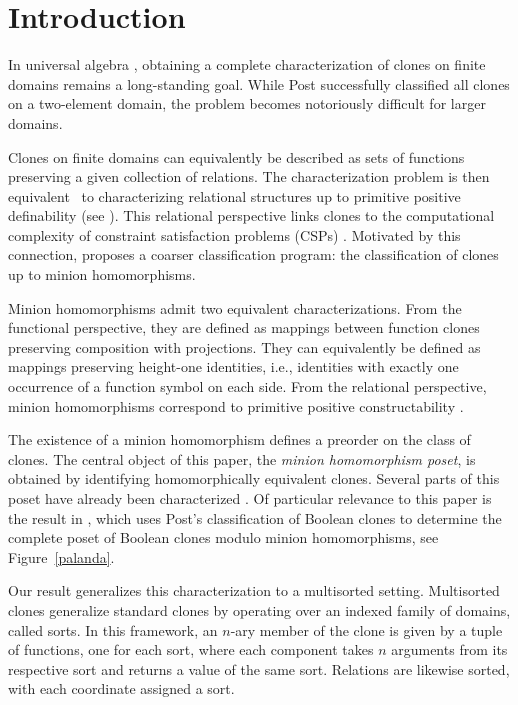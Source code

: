 \documentclass{amsart}
\numberwithin{equation}{section}
\theoremstyle{plain}
\theoremstyle{definition}
\begin{document}
\section{Introduction}\label{sec:intro}

    In universal algebra \cite{universal1, universal2, universal3}, obtaining a complete characterization of clones on finite domains remains a long-standing goal. While Post \cite{post} successfully classified all clones on a two-element domain, the problem becomes notoriously difficult for larger domains. 

  Clones on finite domains can equivalently be described as sets of functions preserving a given collection of relations. The characterization problem is then equivalent~\cite{bodnarchuk,geiger} to characterizing relational structures up to primitive positive definability (see \cite{cspsurvey}).  
   This relational perspective links clones to the computational complexity of constraint satisfaction problems (CSPs) \cite{cspsurvey}. Motivated by this connection, \cite{wonderland, approach} proposes a coarser classification program: the classification of clones up to minion homomorphisms.
   
 Minion homomorphisms admit two equivalent characterizations. From the functional perspective, they are defined as mappings between function clones preserving composition with projections. They can equivalently be defined as mappings preserving height-one identities, i.e., identities with exactly one occurrence of a function symbol on each side.
 From the relational perspective, minion homomorphisms correspond to  primitive positive constructability \cite{wonderland}. 
 
 The existence of a minion homomorphism defines a preorder on the class of clones.
 The central object of this paper, the \emph{minion homomorphism poset}, is obtained by identifying homomorphically equivalent clones.
       Several parts of this poset have already been characterized \cite{vucaj, florian1, florian2, florian3, kapytka}. Of particular relevance to this paper is the result in \cite{vucaj}, which uses Post's classification of Boolean clones \cite{post} to determine the complete poset of Boolean clones modulo minion homomorphisms, see Figure~\ref{palanda}.         

    Our result generalizes this characterization to a multisorted setting. Multisorted clones generalize standard clones by operating over an indexed family of domains, called sorts. In this framework, an $n$-ary member of the clone is given by a tuple of functions, one for each sort, where each component takes $n$ arguments from its respective sort and returns a value of the same sort. Relations are likewise sorted, with each coordinate assigned a sort.
\end{document}
